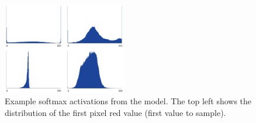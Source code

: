 \begin{figure}[h]
  \centering
  \includegraphics[width=0.48\textwidth]{softmax.pdf}
  \vspace{-0.5cm}
  \caption{Example softmax activations from the model. The top left shows the distribution of the first pixel red value (first value to sample).}
  \label{fig:softmax_activations}
\end{figure}


